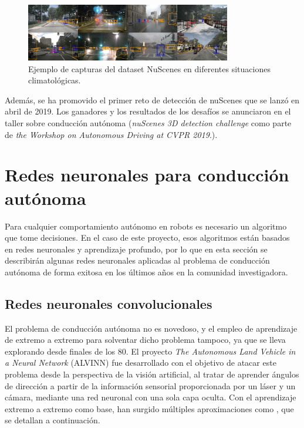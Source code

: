 \begin{figure}
\begin{center}
	\includegraphics[width=0.8\textwidth]{img/nuscenes.jpg}
   \caption{Ejemplo de capturas del dataset NuScenes en diferentes situaciones climatológicas.}
	\label{fig.pilotnet}
\end{center}
\end{figure}

Además, se ha promovido el primer reto de detección de nuScenes que se lanzó en abril de 2019. Los ganadores y los resultados de los desafíos se anunciaron en el taller sobre conducción autónoma (\textit{nuScenes 3D detection challenge} como parte de \textit{the Workshop on Autonomous Driving at CVPR 2019}.).

\section{Redes neuronales para conducción autónoma}
\label{sec:nets}

Para cualquier comportamiento autónomo en robots es necesario un algoritmo que tome decisiones. En el caso de este proyecto, esos algoritmos están basados en redes neuronales y aprendizaje profundo, por lo que en esta sección se describirán algunas redes neuronales aplicadas al problema de conducción autónoma de forma exitosa en los últimos años en la comunidad investigadora.

\subsection{Redes neuronales convolucionales}

El problema de conducción autónoma no es novedoso, y el empleo de aprendizaje de extremo a extremo para solventar dicho problema tampoco, ya que se lleva explorando desde finales de los 80. El proyecto \textit{The Autonomous Land Vehicle in a Neural Network} (ALVINN) \cite{alvinn} fue desarrollado con el objetivo de atacar este problema desde la perspectiva de la visión artificial, al tratar de aprender ángulos de dirección a partir de la información sensorial proporcionada por un láser y un cámara, mediante una red neuronal con una sola capa oculta. Con el aprendizaje extremo a extremo como base, han surgido múltiples aproximaciones como \cite{road} \cite{end2end} \cite{interpretable}, que se detallan a continuación.

